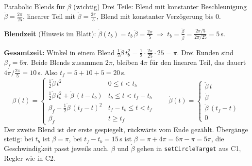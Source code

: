 \documentclass[10pt,a4paper]{article}
\newcommand{\code}[1]{\texttt{#1}}
\begin{document}
\begin{herleitung}{Parabolic Blends für \texorpdfstring{$\beta$}{beta} (wichtig)}
Drei Teile: Blend mit konstanter Beschleunigung $\ddot\beta = \frac{2\pi}{25}$, linearer Teil mit $\dot\beta = \frac{2\pi}{5}$,
Blend mit konstanter Verzögerung bis 0.

\textbf{Blendzeit} (Hinweis im Blatt): $\dot\beta(t_b) = t_b\,\ddot\beta = \frac{2\pi}{5}
\;\Rightarrow\; t_b = \frac{\dot\beta}{\ddot\beta} = \frac{2\pi/5}{2\pi/25} = 5$\,s.

\textbf{Gesamtzeit:} Winkel in einem Blend $\frac12\ddot\beta\,t_b^2 = \frac12 \cdot \frac{2\pi}{25} \cdot 25 = \pi$. Drei
Runden sind $\beta_f = 6\pi$. Beide Blends zusammen $2\pi$, bleiben $4\pi$ für den linearen Teil, das dauert
$4\pi / \frac{2\pi}{5} = 10$\,s. Also $t_f = 5 + 10 + 5 = 20$\,s.
\[
  \beta(t) =
  \begin{cases}
    \frac12\ddot\beta\,t^2 & 0 \le t < t_b \\[2pt]
    \frac12\ddot\beta\,t_b^2 + \dot\beta\,(t - t_b) & t_b \le t < t_f - t_b \\[2pt]
    \beta_f - \frac12\ddot\beta\,(t_f - t)^2 & t_f - t_b \le t < t_f \\[2pt]
    \beta_f & t \ge t_f
  \end{cases}
  \qquad
  \dot\beta(t) =
  \begin{cases}
    \ddot\beta\,t \\[2pt]
    \dot\beta \\[2pt]
    \ddot\beta\,(t_f - t) \\[2pt]
    0
  \end{cases}
\]
Der zweite Blend ist der erste gespiegelt, rückwärts vom Ende gezählt. Übergänge stetig: bei $t_b$ ist $\beta = \pi$, bei
$t_f - t_b = 15$\,s ist $\beta = \pi + 4\pi = 6\pi - \pi = 5\pi$, die Geschwindigkeit passt jeweils auch.
$\beta$ und $\dot\beta$ gehen in \code{setCircleTarget} aus C1, Regler wie in C2.
\end{herleitung}
\end{document}
